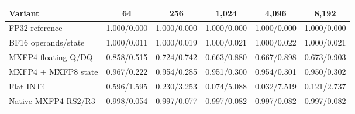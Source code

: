 \begin{tabular}{lccccc}
\toprule
Variant & 64 & 256 & 1{,}024 & 4{,}096 & 8{,}192 \\
\midrule
FP32 reference & 1.000/0.000 & 1.000/0.000 & 1.000/0.000 & 1.000/0.000 & 1.000/0.000 \\
BF16 operands/state & 1.000/0.011 & 1.000/0.019 & 1.000/0.021 & 1.000/0.022 & 1.000/0.021 \\
MXFP4 floating Q/DQ & 0.858/0.515 & 0.724/0.742 & 0.663/0.880 & 0.667/0.898 & 0.673/0.903 \\
MXFP4 + MXFP8 state & 0.967/0.222 & 0.954/0.285 & 0.951/0.300 & 0.954/0.301 & 0.950/0.302 \\
Flat INT4 & 0.596/1.595 & 0.230/3.253 & 0.074/5.088 & 0.032/7.519 & 0.121/2.737 \\
Native MXFP4 RS2/R3 & 0.998/0.054 & 0.997/0.077 & 0.997/0.082 & 0.997/0.082 & 0.997/0.082 \\
\bottomrule
\end{tabular}
